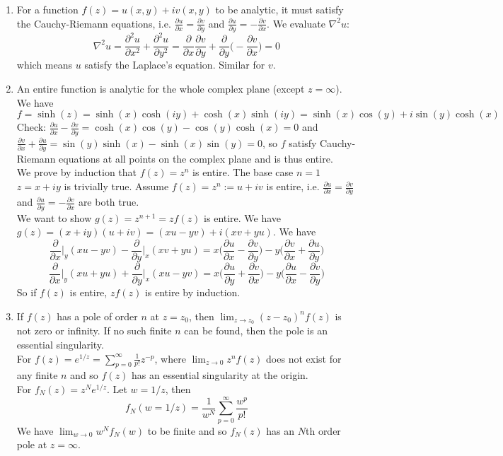 \documentclass[a4paper]{article}
\begin{document}
\begin{ans}\leavevmode
\begin{enumerate}[label=(\alph*)]
\item For a function $f(z)=u(x,y)+iv(x,y)$ to be analytic, it must satisfy the Cauchy-Riemann equations, i.e. $\frac{\partial u}{\partial x}=\frac{\partial v}{\partial y}$ and $\frac{\partial u}{\partial y}=-\frac{\partial v}{\partial x}$. We evaluate $\nabla^2u$:
$$\nabla^2u=\frac{\partial^2u}{\partial x^2}+\frac{\partial^2u}{\partial y^2}=\frac{\partial}{\partial x}\frac{\partial v}{\partial y}+\frac{\partial}{\partial y}\bigg(-\frac{\partial v}{\partial x}\bigg)=0$$
which means $u$ satisfy the Laplace's equation. Similar for $v$.
\item An entire function is analytic for the whole complex plane (except $z=\infty$). We have
$$f=\sinh(z)=\sinh(x)\cosh(iy)+\cosh(x)\sinh(iy)=\sinh(x)\cos(y)+i\sin(y)\cosh(x)$$
Check: $\frac{\partial u}{\partial x}-\frac{\partial v}{\partial y}=\cosh(x)\cos(y)-\cos(y)\cosh(x)=0$ and $\frac{\partial v}{\partial x}+\frac{\partial u}{\partial y}=\sin(y)\sinh(x)-\sinh(x)\sin(y)=0$, so $f$ satisfy Cauchy-Riemann equations at all points on the complex plane and is thus entire.\\[5pt]
We prove by induction that $f(z)=z^n$ is entire. The base case $n=1$ $z=x+iy$ is trivially true. Assume $f(z)=z^n:=u+iv$ is entire, i.e. $\frac{\partial u}{\partial x}=\frac{\partial v}{\partial y}$ and $\frac{\partial u}{\partial y}=-\frac{\partial v}{\partial x}$ are both true.\\[5pt]
We want to show $g(z)=z^{n+1}=zf(z)$ is entire. We have $g(z)=(x+iy)(u+iv)=(xu-yv)+i(xv+yu)$. We have
$$\frac{\partial}{\partial x}\bigg|_y(xu-yv)-\frac{\partial}{\partial y}\bigg|_x(xv+yu)=x\bigg(\frac{\partial u}{\partial x}-\frac{\partial v}{\partial y}\bigg)-y\bigg(\frac{\partial v}{\partial x}+\frac{\partial u}{\partial y}\bigg)$$
$$\frac{\partial}{\partial x}\bigg|_y(xu+yu)+\frac{\partial}{\partial y}\bigg|_x(xu-yv)=x\bigg(\frac{\partial u}{\partial y}+\frac{\partial v}{\partial x}\bigg)-y\bigg(\frac{\partial u}{\partial x}-\frac{\partial v}{\partial y}\bigg)$$
So if $f(z)$ is entire, $zf(z)$ is entire by induction.
\item If $f(z)$ has a pole of order $n$ at $z=z_0$, then $\lim_{z\rightarrow z_0}(z-z_0)^nf(z)$ is not zero or infinity. If no such finite $n$ can be found, then the pole is an essential singularity.\\[5pt]
For $f(z)=e^{1/z}=\sum_{p=0}^\infty\frac{1}{p!}z^{-p}$, where $\lim_{z\rightarrow0}z^nf(z)$ does not exist for any finite $n$ and so $f(z)$ has an essential singularity at the origin.\\[5pt]
For $f_N(z)=z^Ne^{1/z}$. Let $w=1/z$, then
$$f_N(w=1/z)=\frac{1}{w^N}\sum_{p=0}^\infty\frac{w^p}{p!}$$
We have $\lim_{w\rightarrow0}w^Nf_N(w)$ to be finite and so $f_N(z)$ has an $N$th order pole at $z=\infty$.
\end{enumerate}
\end{ans}
\end{document}
